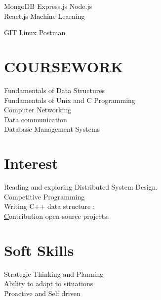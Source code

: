 \documentclass[]{deedy-resume-openfont}
\begin{document}
\begin{minipage}[t]{0.33\textwidth}
 \textbullet{} MongoDB 
\textbullet{}Express.js \textbullet{} Node.js \\
\textbullet{} React.js
 \textbullet{} Machine Learning 
 
 \textbullet{} GIT \textbullet{}Linux \textbullet{}Postman
\sectionsep


\section{COURSEWORK}
\textbullet{}Fundamentals of Data Structures\\
\textbullet{}Fundamentals of Unix and C
 Programming \\
\textbullet{}Computer Networking\\
\textbullet{}Data communication \\
\textbullet{}Database Management Systems\\



\section{Interest}
\textbullet{}Reading and exploring Distributed System Design.\\
\textbullet{}Competitive Programming\\
\textbullet{}Writing C++ data structure : \href{https://github.com/llucifer97/Algorithms-Datastructure}{}\\
\textbullet{}\href{}Contribution open-source projects: \href{https://github.com/pulls?q=is%3Apr+author%3Allucifer97+archived%3Afalse+is%3Aclosed}{\custombold{Link}}\\



 \section{Soft Skills}
 \textbullet{}Strategic Thinking and Planning\\
\textbullet{}Ability to adapt to situations\\
 \textbullet{}Proactive and Self driven
 \sectionsep
%
%

\end{minipage} 
\end{document}
